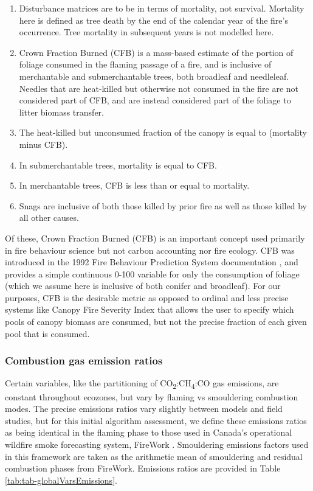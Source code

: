 \documentclass[, manuscript]{copernicus}
\begin{document}
\begin{enumerate}
\def\labelenumi{\arabic{enumi}.}
\item
  Disturbance matrices are to be in terms of mortality, not survival.
  Mortality here is defined as tree death by the end of the calendar
  year of the fire's occurrence. Tree mortality in subsequent years is
  not modelled here.
\item
  Crown Fraction Burned (CFB) is a mass-based estimate of the portion of
  foliage consumed in the flaming passage of a fire, and is inclusive of
  merchantable and submerchantable trees, both broadleaf and needleleaf.
  Needles that are heat-killed but otherwise not consumed in the fire
  are not considered part of CFB, and are instead considered part of the
  foliage to litter biomass transfer.
\item
  The heat-killed but unconsumed fraction of the canopy is equal to
  (mortality minus CFB).
\item
  In submerchantable trees, mortality is equal to CFB.
\item
  In merchantable trees, CFB is less than or equal to mortality.
\item
  Snags are inclusive of both those killed by prior fire as well as
  those killed by all other causes.
\end{enumerate}

Of these, Crown Fraction Burned (CFB) is an important concept used
primarily in fire behaviour science but not carbon accounting nor fire
ecology. CFB was introduced in the 1992 Fire Behaviour Prediction System
documentation \citep{forestrycanadafiredangerratinggroup1992}, and
provides a simple continuous 0-100 variable for only the consumption of
foliage (which we assume here is inclusive of both conifer and
broadleaf). For our purposes, CFB is the desirable metric as opposed to
ordinal and less precise systems like Canopy Fire Severity Index
\citep{kasischke2000} that allows the user to specify which pools of
canopy biomass are consumed, but not the precise fraction of each given
pool that is consumed.

\subsubsection{Combustion gas emission ratios}

Certain variables, like the partitioning of
CO\textsubscript{2}:CH\textsubscript{4}:CO gas emissions, are constant
throughout ecozones, but vary by flaming vs smouldering combustion
modes. The precise emissions ratios vary slightly between models and
field studies, but for this initial algorithm assessment, we define
these emissions ratios as being identical in the flaming phase to those
used in Canada's operational wildfire smoke forecasting system, FireWork
\citep{chen2019}. Smouldering emissions factors used in this framework
are taken as the arithmetic mean of smouldering and residual combustion
phases from FireWork. Emissions ratios are provided in Table
\ref{tab:tab-globalVarsEmissions}.
\end{document}
